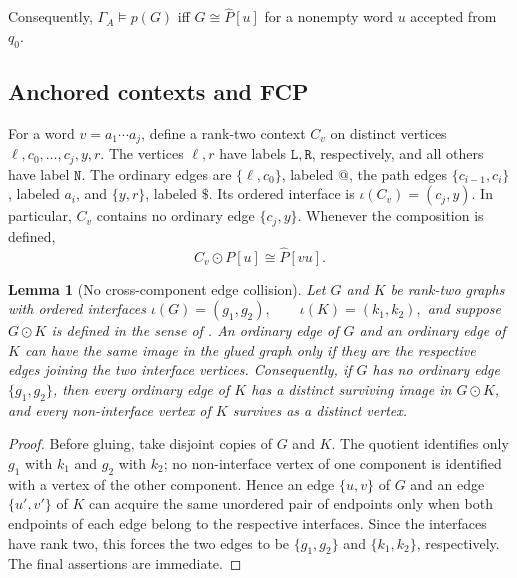 \documentclass[11pt]{article}
\newtheorem{lemma}[theorem]{Lemma}
\theoremstyle{definition}
\theoremstyle{remark}
\begin{document}
Consequently,
\(\Gamma_A\models p(G)\)
iff \(G\cong\widehat P[u]\) for a nonempty word \(u\) accepted from \(q_0\).

\subsection{Anchored contexts and FCP}

For a word \(v=a_1\cdots a_j\), define a rank-two context \(C_v\) on distinct
vertices
\(\ell,c_0,\ldots,c_j,y,r.\)
The vertices \(\ell,r\) have labels \(\mathtt L,\mathtt R\), respectively,
and all others have label \(\mathtt N\). The ordinary edges are
\(\{\ell,c_0\}\), labeled \(\mathtt{@}\), the path edges
\(\{c_{i-1},c_i\}\), labeled \(a_i\), and \(\{y,r\}\), labeled
\(\mathtt{\$}\). Its ordered interface is
\(\iota(C_v)=(c_j,y).\)
In particular, \(C_v\) contains no ordinary edge \(\{c_j,y\}\). Whenever the
composition is defined,
\begin{equation}
\label{eq:anchored-context-concatenation}
C_v\odot P[u]\cong\widehat P[vu].
\end{equation}

\begin{lemma}[No cross-component edge collision]
\label{lem:no-cross-edge-collision}
Let \(G\) and \(K\) be rank-two graphs with ordered interfaces
\(\iota(G)=(g_1,g_2), \qquad \iota(K)=(k_1,k_2),\)
and suppose \(G\odot K\) is defined in the sense of
\cite{ShoudaiEtAl2026}.  An ordinary edge of \(G\) and an ordinary edge of
\(K\) can have the same image in the glued graph only if they are the
respective edges joining the two interface vertices.  Consequently, if \(G\)
has no ordinary edge \(\{g_1,g_2\}\), then every ordinary edge of \(K\) has a
distinct surviving image in \(G\odot K\), and every non-interface vertex of
\(K\) survives as a distinct vertex.
\end{lemma}

\begin{proof}
Before gluing, take disjoint copies of \(G\) and \(K\).  The quotient
identifies only \(g_1\) with \(k_1\) and \(g_2\) with \(k_2\); no
non-interface vertex of one component is identified with a vertex of the
other component.  Hence an edge \(\{u,v\}\) of \(G\) and an edge
\(\{u',v'\}\) of \(K\) can acquire the same unordered pair of endpoints only
when both endpoints of each edge belong to the respective interfaces.  Since
the interfaces have rank two, this forces the two edges to be
\(\{g_1,g_2\}\) and \(\{k_1,k_2\}\), respectively.  The final assertions are
immediate.
\end{proof}
\end{document}
